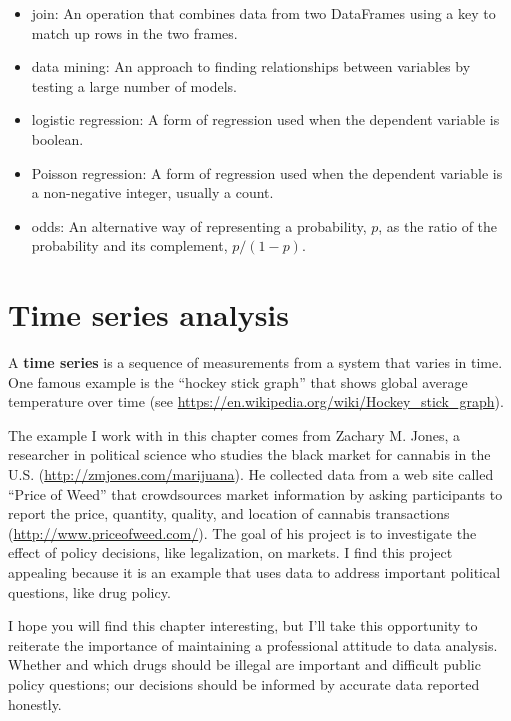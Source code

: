 \documentclass[12pt]{book}
\begin{document}
\begin{itemize}
\item join: An operation that combines data from two DataFrames
using a key to match up rows in the two frames.

\item data mining: An approach to finding relationships between
variables by testing a large number of models.

\item logistic regression: A form of regression used when the
dependent variable is boolean.

\item Poisson regression: A form of regression used when the
dependent variable is a non-negative integer, usually a count.

\item odds: An alternative way of representing a probability, $p$, as
  the ratio of the probability and its complement, $p / (1-p)$.

\end{itemize}



\chapter{Time series analysis}

A {\bf time series} is a sequence of measurements from a system that
varies in time.  One famous example is the ``hockey stick graph'' that
shows global average temperature over time (see
\url{https://en.wikipedia.org/wiki/Hockey_stick_graph}).

The example I work with in this chapter comes from Zachary M. Jones, a
researcher in political science who studies the black market for
cannabis in the U.S.  (\url{http://zmjones.com/marijuana}).  He
collected data from a web site called ``Price of Weed'' that
crowdsources market information by asking participants to report the
price, quantity, quality, and location of cannabis transactions
(\url{http://www.priceofweed.com/}).  The goal of his project is to
investigate the effect of policy decisions, like legalization, on
markets.  I find this project appealing because it is an example that
uses data to address important political questions, like drug policy.

I hope you will
find this chapter interesting, but I'll take this opportunity to
reiterate the importance of maintaining a professional attitude to
data analysis.  Whether and which drugs should be illegal are
important and difficult public policy questions; our decisions should
be informed by accurate data reported honestly.
\end{document}
